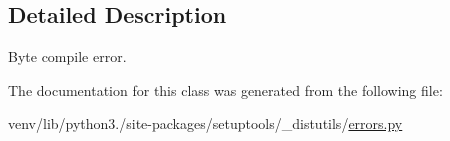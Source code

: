 \subsection{Detailed Description}
\begin{DoxyVerb}Byte compile error.\end{DoxyVerb}
 

The documentation for this class was generated from the following file\+:\begin{DoxyCompactItemize}
\item 
venv/lib/python3./site-\/packages/setuptools/\+\_\+distutils/\hyperlink{__distutils_2errors_8py}{errors.\+py}\end{DoxyCompactItemize}
